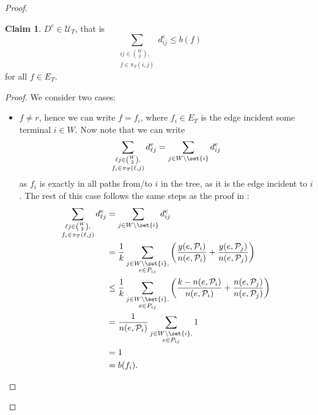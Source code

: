 \documentclass[11pt]{article}
\theoremstyle{definition}
\newtheorem{claim}{Claim}
\begin{document}
\begin{proof}
        \renewcommand\theclaim{1}
        \begin{claim}
            $D^e \in \mathcal U_T$, that is
            \[
                \sum_{\substack{ij \in \binom{W}{2},\\f \in \pi_T(i,j)}} d^e_{ij} \le b(f)
            \]
            for all $f \in E_T$.
        \end{claim}
        \begin{proof}
            We consider two cases:
            \begin{itemize}
                \item $f \neq r$, hence we can write $f = f_i$, where $f_i \in E_T$ is the edge incident some terminal $i \in W$.
                Now note that we can write
                \[
                    \sum_{\substack{\ell j \in \binom{W}{2},\\f_i \in \pi_T(\ell,j)}} d^e_{\ell j} = \sum_{j \in W \setminus \set{i}} d^e_{ij}
                \]
                as $f_i$ is exactly in all paths from/to $i$ in the tree, as it is the edge incident to $i$.
                The rest of this case follows the same steps as the proof in \cite{grandoni2008short}:
                \[
                    \begin{split}
                        \sum_{\substack{\ell j \in \binom{W}{2},\\f_i \in \pi_T(\ell,j)}} d^e_{\ell j} &= \sum_{j \in W \setminus \set{i}} d^e_{ij} \\
                        &= \frac 1 k \sum_{\substack{j \in W \setminus \set{i},\\ e \in P_{ij}}} \left( \frac{y(e, \mathcal P_i)}{n(e, \mathcal P_i)} + \frac{y(e, \mathcal P_j)}{n(e, \mathcal P_j)} \right) \\
                        &\le \frac 1 k \sum_{\substack{j \in W \setminus \set{i},\\ e \in P_{ij}}} \left( \frac{k - n(e, \mathcal P_i)}{n(e, \mathcal P_i)} + \frac{n(e, \mathcal P_j)}{n(e, \mathcal P_j)} \right) \\
                        &= \frac{1}{n(e, \mathcal P_i)} \sum_{\substack{j \in W \setminus \set{i},\\ e \in P_{ij}}} 1 \\
                        &= 1 \\
                        &= b(f_i).
                    \end{split}
                \]


\end{itemize}
\end{proof}
\end{proof}
\end{document}
